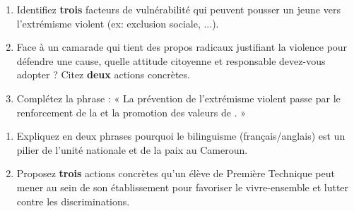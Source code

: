 \documentclass[11pt]{article}
\begin{document}
\begin{exercice}
\begin{enumerate}
    \item Identifiez \textbf{trois} facteurs de vulnérabilité qui peuvent pousser un jeune vers l'extrémisme violent (ex: exclusion sociale, ...).
    \item Face à un camarade qui tient des propos radicaux justifiant la violence pour défendre une cause, quelle attitude citoyenne et responsable devez-vous adopter ? Citez \textbf{deux} actions concrètes.
    \item Complétez la phrase : « La prévention de l'extrémisme violent passe par le renforcement de la \underline{\hspace{5cm}} et la promotion des valeurs de \underline{\hspace{5cm}}. »
\end{enumerate}
\end{exercice}

\begin{exercice}
\begin{enumerate}
    \item Expliquez en deux phrases pourquoi le bilinguisme (français/anglais) est un pilier de l'unité nationale et de la paix au Cameroun.
    \item Proposez \textbf{trois} actions concrètes qu'un élève de Première Technique peut mener au sein de son établissement pour favoriser le vivre-ensemble et lutter contre les discriminations.
\end{enumerate}
\end{exercice}
\end{document}
